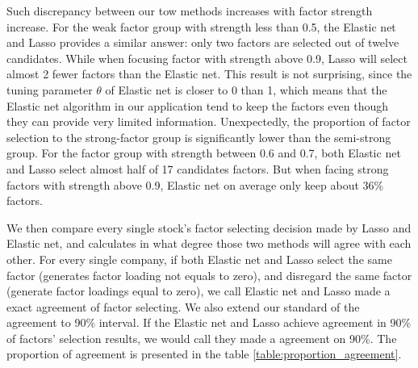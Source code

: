 Such discrepancy between our tow methods increases with factor strength increase.
For the weak factor group with strength less than 0.5, the Elastic net and Lasso provides a similar answer: only two factors are selected out of twelve candidates.
While when focusing factor with strength above 0.9, Lasso will select almost 2 fewer factors than the Elastic net.
This result is not surprising, since the tuning parameter $\theta$ of Elastic net is closer to 0 than 1, which means that the Elastic net algorithm in our application tend to keep the factors even though they can provide very limited information.
Unexpectedly, the proportion of factor selection to the strong-factor group is significantly lower than the semi-strong group.
For the factor group with strength between 0.6 and 0.7, both Elastic net and Lasso select almost half of 17 candidates factors. 
But when facing strong factors with strength above 0.9, Elastic net on average only keep about 36\% factors.


We then compare every single stock's factor selecting decision made by Lasso and Elastic net, and calculates in what degree those two methods will agree with each other.
For every single company, if both Elastic net and Lasso select the same factor (generates factor loading not equals to zero), and disregard the same factor (generate factor loadings equal to zero), we call Elastic net and Lasso made a exact agreement of factor selecting.
We also extend our standard of the agreement to 90\% interval. 
If the Elastic net and Lasso achieve agreement in 90\% of factors' selection results, we would call they made a agreement on 90\%.
The proportion of agreement is presented in the table \ref{table:proportion_agreement}.

